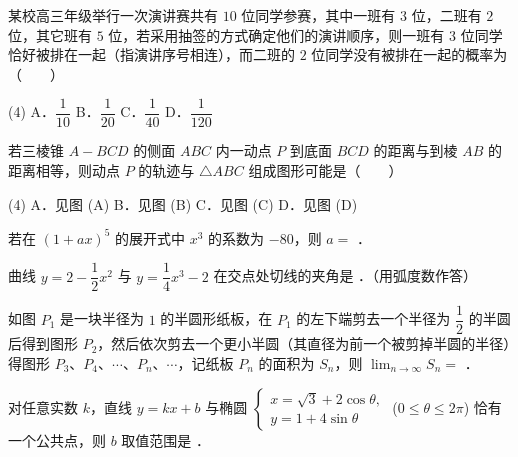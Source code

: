 \begin{question}
某校高三年级举行一次演讲赛共有 $10$ 位同学参赛，其中一班有 $3$ 位，二班有 $2$ 位，其它班有 $5$ 位，若采用抽签的方式确定他们的演讲顺序，则一班有 $3$ 位同学恰好被排在一起（指演讲序号相连），而二班的 $2$ 位同学没有被排在一起的概率为\mbox{（　　）}

\begin{gkopts}(4)
\task A．$\dfrac{1}{10}$
\task B．$\dfrac{1}{20}$
\task C．$\dfrac{1}{40}$
\task D．$\dfrac{1}{120}$
\end{gkopts}

\Needspace{0.4\textheight}
\end{question}
\begin{question}
若三棱锥 $A - BCD$ 的侧面 $ABC$ 内一动点 $P$ 到底面 $BCD$ 的距离与到棱 $AB$ 的距离相等，则动点 $P$ 的轨迹与 $\triangle ABC$ 组成图形可能是\mbox{（　　）}
\nopagebreak[4]
\begin{center}\end{center}
\nopagebreak[4]
\begin{gkopts}(4)
\task A．见图 (A)
\task B．见图 (B)
\task C．见图 (C)
\task D．见图 (D)
\end{gkopts}

\end{question}

\begin{question}
若在 $(1 + ax)^5$ 的展开式中 $x^3$ 的系数为 $-80$，则 $a =$ \gkblank{}．

\end{question}
\begin{question}
曲线 $y = 2 - \dfrac{1}{2}x^2$ 与 $y = \dfrac{1}{4}x^3 - 2$ 在交点处切线的夹角是 \gkblank{}．（用弧度数作答）

\Needspace{0.4\textheight}
\end{question}
\begin{question}
如图 $P_1$ 是一块半径为 $1$ 的半圆形纸板，在 $P_1$ 的左下端剪去一个半径为 $\dfrac{1}{2}$ 的半圆后得到图形 $P_2$，然后依次剪去一个更小半圆（其直径为前一个被剪掉半圆的半径）得图形 $P_3$、$P_4$、$\cdots$、$P_n$、$\cdots$，记纸板 $P_n$ 的面积为 $S_n$，则 $\lim_{n \to \infty} S_n =$ \gkblank{}．
\nopagebreak[4]
\begin{center}\end{center}
\nopagebreak[4]
\end{question}
\begin{question}
对任意实数 $k$，直线 $y = kx + b$ 与椭圆 $\begin{cases} x = \sqrt{3} + 2\cos\theta, \\ y = 1 + 4\sin\theta \end{cases}$ ($0 \leqslant \theta \leqslant 2\pi$) 恰有一个公共点，则 $b$ 取值范围是 \gkblank{}．

\end{question}

